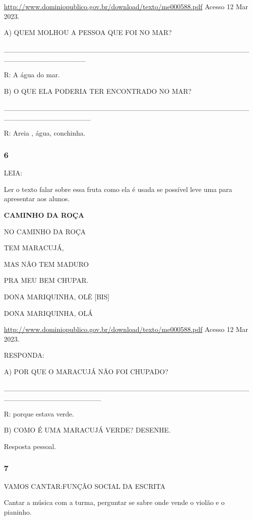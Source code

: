 \url{http://www.dominiopublico.gov.br/download/texto/me000588.pdf}
Acesso 12 Mar 2023.

A) QUEM MOLHOU A PESSOA QUE FOI NO MAR?

\_\_\_\_\_\_\_\_\_\_\_\_\_\_\_\_\_\_\_\_\_\_\_\_\_\_\_\_\_\_\_\_\_\_\_\_\_\_\_\_\_\_\_\_\_\_\_\_\_\_\_\_\_\_\_\_\_\_\_\_\_\_\_\_

R: A água do mar.

B) O QUE ELA PODERIA TER ENCONTRADO NO MAR?

\_\_\_\_\_\_\_\_\_\_\_\_\_\_\_\_\_\_\_\_\_\_\_\_\_\_\_\_\_\_\_\_\_\_\_\_\_\_\_\_\_\_\_\_\_\_\_\_\_\_\_\_\_\_\_\_\_\_\_\_\_\_\_\_\_

R: Areia , água, conchinha.

\subsubsection{6 }\label{section-73}

LEIA:

Ler o texto falar sobre essa fruta como ela é usada se possível leve uma
para apresentar aos alunos.

\textbf{CAMINHO DA ROÇA}

NO CAMINHO DA ROÇA

TEM MARACUJÁ,

MAS NÃO TEM MADURO

PRA MEU BEM CHUPAR.

DONA MARIQUINHA, OLÊ {[}BIS{]}

DONA MARIQUINHA, OLÁ

\url{http://www.dominiopublico.gov.br/download/texto/me000588.pdf}
Acesso 12 Mar 2023.

RESPONDA:

A) POR QUE O MARACUJÁ NÃO FOI CHUPADO?

\_\_\_\_\_\_\_\_\_\_\_\_\_\_\_\_\_\_\_\_\_\_\_\_\_\_\_\_\_\_\_\_\_\_\_\_\_\_\_\_\_\_\_\_\_\_\_\_\_\_\_\_\_\_\_\_\_\_\_\_\_\_\_\_\_\_\_

R: porque estava verde.

B) COMO É UMA MARACUJÁ VERDE? DESENHE.

Resposta pessoal.

\subsubsection{7 }\label{section-74}

VAMOS CANTAR:FUNÇÃO SOCIAL DA ESCRITA

Cantar a música com a turma, perguntar se sabre onde vende o violão e o
pianinho.

